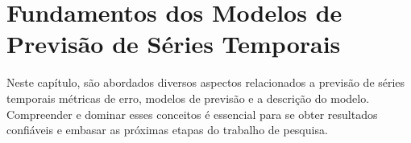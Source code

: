 \section{Fundamentos dos Modelos de Previs\~ao de S\'eries Temporais}\label{sec:base}

 Neste capítulo, são abordados diversos aspectos relacionados a previsão de séries temporais métricas de erro, modelos de previsão e a descrição do modelo. Compreender e dominar esses conceitos é essencial para se obter resultados confiáveis e embasar as próximas etapas do trabalho de pesquisa.










%

